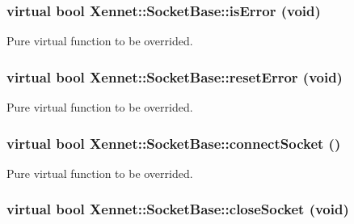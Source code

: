 \hypertarget{classXennet_1_1SocketBase_6639e3721fda60b5859f9c87c5a79d6a}{
\subsubsection{\setlength{\rightskip}{0pt plus 5cm}virtual bool Xennet::SocketBase::isError (void)}}
\label{classXennet_1_1SocketBase_6639e3721fda60b5859f9c87c5a79d6a}


Pure virtual function to be overrided. 

\hypertarget{classXennet_1_1SocketBase_2516dbd6d571f60f61002fbe294989f9}{
\subsubsection{\setlength{\rightskip}{0pt plus 5cm}virtual bool Xennet::SocketBase::resetError (void)}}
\label{classXennet_1_1SocketBase_2516dbd6d571f60f61002fbe294989f9}


Pure virtual function to be overrided. 

\hypertarget{classXennet_1_1SocketBase_ac861f3d4a84f91e1e9532cdfdbfffdd}{
\subsubsection{\setlength{\rightskip}{0pt plus 5cm}virtual bool Xennet::SocketBase::connectSocket ()}}
\label{classXennet_1_1SocketBase_ac861f3d4a84f91e1e9532cdfdbfffdd}


Pure virtual function to be overrided. 

\hypertarget{classXennet_1_1SocketBase_59a3d033e8257f08b8419fb57529c2a3}{
\subsubsection{\setlength{\rightskip}{0pt plus 5cm}virtual bool Xennet::SocketBase::closeSocket (void)}}
\label{classXennet_1_1SocketBase_59a3d033e8257f08b8419fb57529c2a3}


